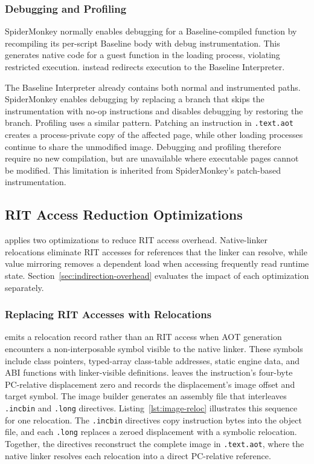 \documentclass[sigplan,screen,review,anonymous]{acmart}
\newcommand{\AM}{\leavevmode{\sc AmberMonkey}}
\begin{document}
\subsubsection{Debugging and Profiling}

SpiderMonkey normally enables debugging for a Baseline-compiled function by recompiling its per-script Baseline body with debug instrumentation. This generates native code for a guest function in the loading process, violating restricted execution. \AM{} instead redirects execution to the Baseline Interpreter.

The Baseline Interpreter already contains both normal and instrumented paths. SpiderMonkey enables debugging by replacing a branch that skips the instrumentation with no-op instructions and disables debugging by restoring the branch. Profiling uses a similar pattern. Patching an instruction in \texttt{.text.aot} creates a process-private copy of the affected page, while other loading processes continue to share the unmodified image. Debugging and profiling therefore require no new compilation, but are unavailable where executable pages cannot be modified. This limitation is inherited from SpiderMonkey's patch-based instrumentation.

\subsection{RIT Access Reduction Optimizations}

\AM{} applies two optimizations to reduce RIT access overhead. Native-linker relocations eliminate RIT accesses for references that the linker can resolve, while value mirroring removes a dependent load when accessing frequently read runtime state. Section~\ref{sec:indirection-overhead} evaluates the impact of each optimization separately.

\subsubsection{Replacing RIT Accesses with Relocations}

\AM{} emits a relocation record rather than an RIT access when AOT generation encounters a non-interposable symbol visible to the native linker. These symbols include class pointers, typed-array class-table addresses, static engine data, and ABI functions with linker-visible definitions. \AM{} leaves the instruction's four-byte PC-relative displacement zero and records the displacement's image offset and target symbol. The image builder generates an assembly file that interleaves \texttt{.incbin} and \texttt{.long} directives. Listing~\ref{lst:image-reloc} illustrates this sequence for one relocation. The \texttt{.incbin} directives copy instruction bytes into the object file, and each \texttt{.long} replaces a zeroed displacement with a symbolic relocation. Together, the directives reconstruct the complete image in \texttt{.text.aot}, where the native linker resolves each relocation into a direct PC-relative reference.
\end{document}
